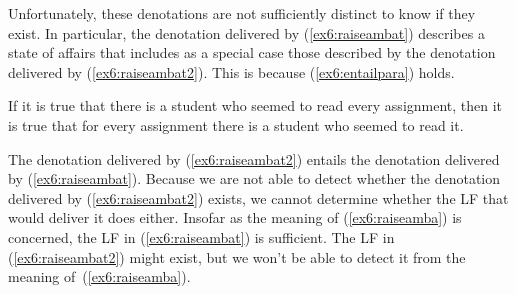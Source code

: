 Unfortunately, these denotations are not sufficiently distinct to know if they exist. In particular, the denotation delivered by (\ref{ex6:raiseambat}) describes a state of affairs that includes as a special case those described by the denotation delivered by (\ref{ex6:raiseambat2}). This is because (\ref{ex6:entailpara}) holds.
\begin{exe}
\raggedright
	\ex \label{ex6:entailpara}
	If it is true that there is a student who seemed to read every assignment, then it is true that for every assignment there is a student who seemed to read it. 
\end{exe}
The denotation delivered by (\ref{ex6:raiseambat2}) entails the denotation delivered by (\ref{ex6:raiseambat}). Because we are not able to detect whether the denotation delivered by (\ref{ex6:raiseambat2}) exists, we cannot determine whether the LF that would deliver it does either. Insofar as the meaning of (\ref{ex6:raiseamba}) is concerned, the LF in (\ref{ex6:raiseambat}) is sufficient. The LF in (\ref{ex6:raiseambat2}) might exist, but we won't be able to detect it from the meaning of~(\ref{ex6:raiseamba}).


